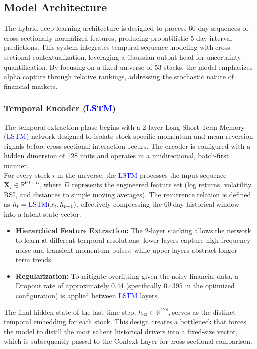 \documentclass[twoside,final]{hcmut-report}
\begin{document}
\subsection{Model Architecture}
The hybrid deep learning architecture is designed to process 60-day sequences of cross-sectionally normalized features, producing probabilistic 5-day interval predictions. This system integrates temporal sequence modeling with cross-sectional contextualization, leveraging a Gaussian output head for uncertainty quantification. By focusing on a fixed universe of 53 stocks, the model emphasizes alpha capture through relative rankings, addressing the stochastic nature of financial markets.

\subsubsection{Temporal Encoder (\textcolor{blue}{LSTM})}
\label{section_4.1.1}
The temporal extraction phase begins with a 2-layer Long Short-Term Memory (\textcolor{blue}{LSTM}) network designed to isolate stock-specific momentum and mean-reversion signals before cross-sectional interaction occurs. The encoder is configured with a hidden dimension of 128 units and operates in a unidirectional, batch-first manner.\\

For every stock $i$ in the universe, the \textcolor{blue}{LSTM} processes the input sequence $\mathbf{X}_i \in \mathbb{R}^{60 \times D}$, where $D$ represents the engineered feature set (log returns, volatility, RSI, and distances to simple moving averages). The recurrence relation is defined as $h_t = \mathrm{\textcolor{blue}{LSTM}}(x_t, h_{t-1})$, effectively compressing the 60-day historical window into a latent state vector.

\begin{itemize}
  \item \textbf{Hierarchical Feature Extraction:} The 2-layer stacking allows the network to learn at different temporal resolutions: lower layers capture high-frequency noise and transient momentum pulses, while upper layers abstract longer-term trends.
  \item \textbf{Regularization:} To mitigate overfitting given the noisy financial data, a Dropout rate of approximately 0.44 (specifically 0.4395 in the optimized configuration) is applied between \textcolor{blue}{LSTM} layers.
\end{itemize}

The final hidden state of the last time step, $h_{60} \in \mathbb{R}^{128}$, serves as the distinct temporal embedding for each stock. This design creates a bottleneck that forces the model to distill the most salient historical drivers into a fixed-size vector, which is subsequently passed to the Context Layer for cross-sectional comparison.
\end{document}
